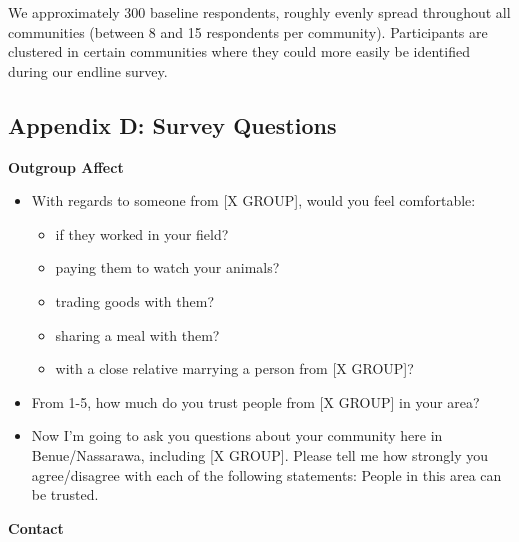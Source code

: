 \documentclass[
]{article}
\providecommand{\tightlist}{%
  \setlength{\itemsep}{0pt}\setlength{\parskip}{0pt}}
\begin{document}
We approximately 300 baseline respondents, roughly evenly spread
throughout all communities (between 8 and 15 respondents per community).
Participants are clustered in certain communities where they could more
easily be identified during our endline survey.

\hypertarget{appendix-d-survey-questions}{%
\subsection{Appendix D: Survey
Questions}\label{appendix-d-survey-questions}}

\textbf{Outgroup Affect}

\begin{itemize}
\tightlist
\item
  With regards to someone from {[}X GROUP{]}, would you feel
  comfortable:

  \begin{itemize}
  \tightlist
  \item
    if they worked in your field?
  \item
    paying them to watch your animals?
  \item
    trading goods with them?
  \item
    sharing a meal with them?
  \item
    with a close relative marrying a person from {[}X GROUP{]}?
  \end{itemize}
\item
  From 1-5, how much do you trust people from {[}X GROUP{]} in your
  area?
\item
  Now I'm going to ask you questions about your community here in
  Benue/Nassarawa, including {[}X GROUP{]}. Please tell me how strongly
  you agree/disagree with each of the following statements: People in
  this area can be trusted.
\end{itemize}

\textbf{Contact}
\end{document}
